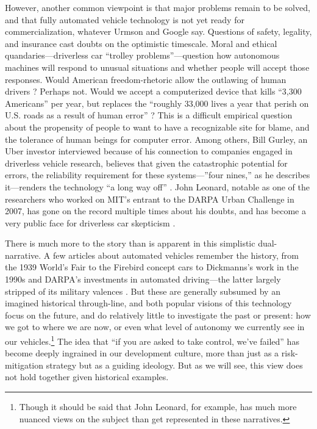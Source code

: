 However, another common viewpoint is that major problems remain to be
solved, and that fully automated vehicle technology is not yet ready for
commercialization, whatever Urmson and Google 
say. Questions of safety, legality, and insurance cast doubts on the
optimistic timescale. Moral and ethical
quandaries---driverless car ``trolley problems''---question how
autonomous machines will respond to unusual situations and whether
people will accept those responses. Would American freedom-rhetoric
allow the outlawing of human drivers \cite{badgerElon}? 
Perhaps not. Would we accept a computerized device that kills ``3,300
Americans'' per year, but replaces the ``roughly 33,000 lives a year
that perish on U.S. roads as a result of human
error'' \cite{mcfarlandDriverless}?
This is a difficult empirical question about the propensity of people
to want to have a recognizable site for blame, and the tolerance of
human beings for computer error. Among others, Bill Gurley, an Uber
investor interviewed because of his connection to companies engaged in
driverless vehicle research, believes that given the
catastrophic potential for errors, the reliability requirement
for these systems---''four nines,'' as he describes it---renders the
technology ``a long way 
off'' \cite{shontellTop}. John Leonard, notable as one of the researchers who
worked on MIT's entrant to the DARPA Urban Challenge in 2007, has gone
on the record multiple times about his doubts, and has become a very
public face for driverless car skepticism \cite{ramseyWhen} \cite{gomesCircles}.




There is much more to the story than is
apparent in this simplistic dual-narrative.  A few
articles about automated vehicles remember the history, from the 1939
World's Fair \cite{CBSPetersen} to the Firebird concept cars
\cite{walshVs} to Dickmanns's work in the 
1990s \cite{HCRIDriverless} and DARPA's investments in automated
driving---the latter largely stripped of its
 military valences \cite{economistSR}. But these are generally subsumed by an imagined
 historical through-line, and both popular visions of this
technology focus on the future, and do relatively little to
investigate the past or present: how we got to 
where we are now, or even what level of autonomy we currently see in
our vehicles.\footnote{Though it should
  be said that John Leonard, for example, has much more nuanced views
  on the subject than get represented in these narratives.} The idea that ``if you are asked to take control, we've
failed'' has become deeply ingrained in our development
culture, more than just as a risk-mitigation strategy but as a guiding
ideology. But as we will see, this view does not hold together given
historical examples.

